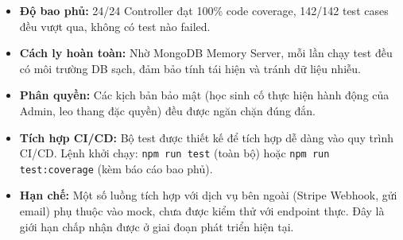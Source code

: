 \begin{itemize}[leftmargin=*]
  \item \textbf{Độ bao phủ:} 24/24 Controller đạt 100\% code coverage, 142/142
        test cases đều vượt qua, không có test nào failed.
  \item \textbf{Cách ly hoàn toàn:} Nhờ MongoDB Memory Server, mỗi lần chạy test
        đều có môi trường DB sạch, đảm bảo tính tái hiện và tránh dữ liệu nhiễu.
  \item \textbf{Phân quyền:} Các kịch bản bảo mật (học sinh cố thực hiện hành động
        của Admin, leo thang đặc quyền) đều được ngăn chặn đúng đắn.
  \item \textbf{Tích hợp CI/CD:} Bộ test được thiết kế để tích hợp dễ dàng vào
        quy trình CI/CD. Lệnh khởi chạy: \texttt{npm run test} (toàn bộ) hoặc
        \texttt{npm run test:coverage} (kèm báo cáo bao phủ).
  \item \textbf{Hạn chế:} Một số luồng tích hợp với dịch vụ bên ngoài (Stripe Webhook,
        gửi email) phụ thuộc vào mock, chưa được kiểm thử với endpoint thực.
        Đây là giới hạn chấp nhận được ở giai đoạn phát triển hiện tại.
\end{itemize}

